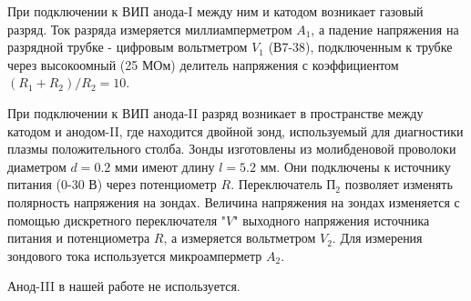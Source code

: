 \documentclass[14pt]{article}
\begin{document}
При подключении к ВИП анода-I между ним и катодом возникает газовый разряд. Ток разряда измеряется миллиамперметром $A_1$, а падение напряжения на разрядной трубке - цифровым вольтметром $V_1$ (В7-38), подключенным к трубке через высокоомный (25 МОм) делитель напряжения с коэффициентом $(R_1 + R_2)/R_2 = 10$.

При подключении к ВИП анода-II разряд возникает в пространстве между катодом и анодом-II, где находится двойной зонд, используемый для диагностики плазмы положительного столба. Зонды изготовлены из молибденовой проволоки диаметром $d = 0.2$ мми имеют длину $l = 5.2$ мм. Они подключены к источнику питания (0-30 В) через потенциометр $R$. Переключатель П$_2$ позволяет изменять полярность напряжения на зондах. Величина напряжения на зондах изменяется с помощью дискретного переключателя "$V$" выходного напряжения источника питания и потенциометра $R$, а измеряется вольтметром $V_2$. Для измерения зондового тока используется микроамперметр $A_2$. 

Анод-III в нашей работе не используется. 
\end{document}

